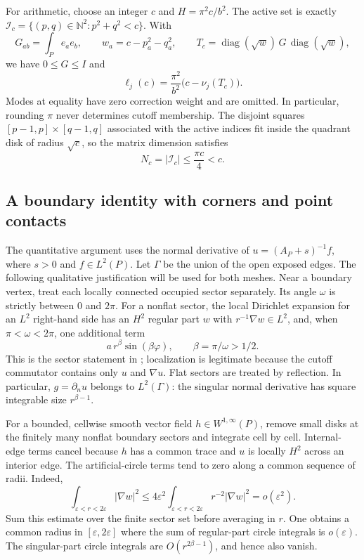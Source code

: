 \documentclass[11pt,reqno]{amsart}
\numberwithin{equation}{section}
\newcommand{\N}{\mathbb N}
\begin{document}
For arithmetic, choose an integer $c$ and $H=\pi^2c/b^2$.
The active set is exactly
$\mathcal I_c=\{(p,q)\in\N^2:p^2+q^2<c\}$.  With
\[
 G_{ab}=\int_P e_a e_b,\qquad
 w_a=c-p_a^2-q_a^2,\qquad
 T_c=\operatorname{diag}(\sqrt w)\,G\,
                  \operatorname{diag}(\sqrt w),
\]
we have $0\le G\le I$ and
\begin{equation}\label{cert:integer-cutoff}
 \ell_j(c)=\frac{\pi^2}{b^2}\bigl(c-\nu_j(T_c)\bigr).
\end{equation}
Modes at equality have zero correction weight and are omitted.
In particular, rounding $\pi$ never determines cutoff membership.
The disjoint squares $[p-1,p]\times[q-1,q]$ associated with the
active indices fit inside the quadrant disk of radius $\sqrt c$,
so the matrix dimension satisfies
\begin{equation}\label{cert:mode-count}
 N_c=|\mathcal I_c|\le\frac{\pi c}{4}<c.
\end{equation}

\subsection{A boundary identity with corners and point contacts}
\label{cert:corners}

The quantitative argument uses the normal derivative of
$u=(A_P+s)^{-1}f$, where $s>0$ and $f\in L^2(P)$.
Let $\Gamma$ be the union of the open exposed edges.  The
following qualitative justification will be used for both meshes.
Near a boundary vertex, treat each locally connected occupied
sector separately.  Its angle $\omega$ is strictly between $0$
and $2\pi$.  For a nonflat sector, the local Dirichlet expansion
for an $L^2$ right-hand side has an $H^2$ regular part $w$ with
$r^{-1}\nabla w\in L^2$, and, when $\pi<\omega<2\pi$, one
additional term
\[
 a\,r^\beta\sin(\beta\varphi),\qquad \beta=\pi/\omega>1/2.
\]
This is the sector statement in
\cite[Theorem~L.1]{Dauge2018}; localization is legitimate because
the cutoff commutator contains only $u$ and $\nabla u$.
Flat sectors are treated by reflection.  In particular,
$g=\partial_nu$ belongs to $L^2(\Gamma)$: the singular normal
derivative has square integrable size $r^{\beta-1}$.

For a bounded, cellwise smooth vector field $h\in W^{1,\infty}(P)$,
remove small disks at the finitely many nonflat boundary sectors
and integrate cell by cell.  Internal-edge terms cancel because
$h$ has a common trace and $u$ is locally $H^2$ across an interior
edge.  The artificial-circle terms tend to zero along a common
sequence of radii.  Indeed,
\[
 \int_{\varepsilon<r<2\varepsilon}|\nabla w|^2
 \le4\varepsilon^2
       \int_{\varepsilon<r<2\varepsilon}r^{-2}|\nabla w|^2
 =o(\varepsilon^2).
\]
Sum this estimate over the finite sector set before averaging in
$r$.  One obtains a common radius in $[\varepsilon,2\varepsilon]$
where the sum of regular-part circle integrals is
$o(\varepsilon)$.  The singular-part circle integrals are
$O(r^{2\beta-1})$, and hence also vanish.
\end{document}
